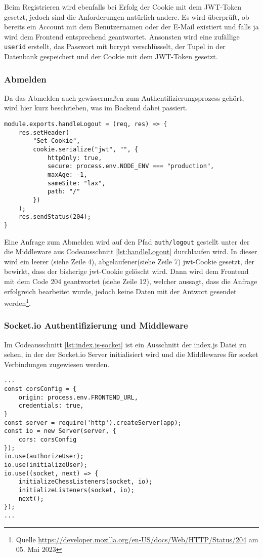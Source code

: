 Beim Registrieren wird ebenfalls bei Erfolg der Cookie mit dem JWT-Token gesetzt, jedoch sind die Anforderungen natürlich andere. Es wird überprüft, ob bereits ein Account mit dem Benutzernamen oder der E-Mail existiert und falls ja wird dem Frontend entsprechend geantwortet. Ansonsten wird eine zufällige \verb|userid| erstellt, das Passwort mit bcrypt verschlüsselt, der Tupel in der Datenbank gespeichert und der Cookie mit dem JWT-Token gesetzt.

\subsubsection{Abmelden}
Da das Abmelden auch gewissermaßen zum Authentifizierungsprozess gehört, wird hier kurz beschrieben, was im Backend dabei passiert.

\begin{lstlisting}[style=codeStyle, caption={Middleware zum Abmelden}, label={lst:handleLogout}]
module.exports.handleLogout = (req, res) => {
    res.setHeader(
        "Set-Cookie",
        cookie.serialize("jwt", "", {
            httpOnly: true,
            secure: process.env.NODE_ENV === "production",
            maxAge: -1,
            sameSite: "lax",
            path: "/"
        })
    );
    res.sendStatus(204);
}
\end{lstlisting}

Eine Anfrage zum Abmelden wird auf den Pfad \verb|auth/logout| gestellt unter der die Middleware aus Codeausschnitt \ref{lst:handleLogout} durchlaufen wird. In dieser wird ein leerer (siehe Zeile 4), abgelaufener(siehe Zeile 7) \glqq jwt\grqq -Cookie gesetzt, der bewirkt, dass der bisherige \glqq jwt\grqq -Cookie gelöscht wird. Dann wird dem Frontend mit dem Code 204 geantwortet (siehe Zeile 12), welcher aussagt, dass die Anfrage erfolgreich bearbeitet wurde, jedoch keine Daten mit der Antwort gesendet werden\footnote{Quelle \url{https://developer.mozilla.org/en-US/docs/Web/HTTP/Status/204} am 05. Mai 2023}.

\subsubsection{Socket.io Authentifizierung und Middleware}
\label{sec:Backend-Socket}
Im Codeausschnitt \ref{lst:index.js-socket} ist ein Ausschnitt der index.js Datei zu sehen, in der der Socket.io Server initialisiert wird und die Middlewares für socket Verbindungen zugewiesen werden.

\begin{lstlisting}[style=codeStyle, caption={Ausschnitt der index.js Datei mit Socket.io Server Erstellung und Middleware Zuweisung}, label={lst:index.js-socket}]
...
const corsConfig = {
    origin: process.env.FRONTEND_URL,
    credentials: true,
}
const server = require('http').createServer(app);
const io = new Server(server, {
    cors: corsConfig
});
io.use(authorizeUser);
io.use(initializeUser);
io.use((socket, next) => {
    initializeChessListeners(socket, io);
    initializeListeners(socket, io);
    next();
});
...
\end{lstlisting}

